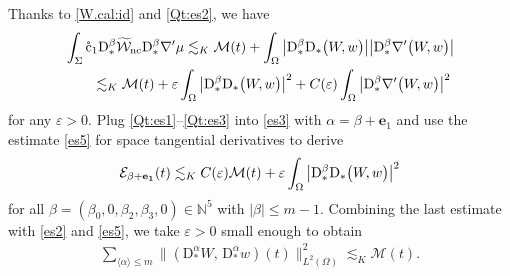\documentclass[twoside,11pt]{article}
\numberwithin{equation}{section}
\begin{document}
Thanks to \eqref{W.cal:id} and \eqref{Qt:es2}, we have
\begin{align}
&\int_{\Sigma} \mathring{\rm c}_1\mathrm{D}_*^{\beta} \widetilde{\mathcal{W}}_{\rm nc}\mathrm{D}_*^{\beta} \nabla'\mu
	\lesssim_K
	\mathcal{M}(t)+
	 \int_{\Omega} \big|\mathrm{D}_*^{\beta} \mathrm{D}_*\big( W,  w \big)\big|
	 \big|\mathrm{D}_*^{\beta} \nabla'\big(  W,  w \big)\big|
	 \nonumber\\
&\qquad 	 \lesssim_K
	 	 \mathcal{M}(t)+
	 \varepsilon \int_{\Omega} \big|\mathrm{D}_*^{\beta} \mathrm{D}_*\big( W,  w \big)\big|^2
	 +C(\varepsilon)
	 \int_{\Omega} \big|\mathrm{D}_*^{\beta} \nabla'\big( W,  w \big)\big|^2
	 \label{Qt:es3}
\end{align}
for any $\varepsilon>0$.
Plug \eqref{Qt:es1}--\eqref{Qt:es3} into \eqref{es3} with $\alpha=\beta+\mathbf{e}_1$ and use
the estimate \eqref{es5} for space tangential derivatives to derive
\begin{align}
\mathcal{E}_{\beta+\bf{e}_1}(t)
	\lesssim_K
	C(\varepsilon)\mathcal{M}(t)+
	\varepsilon \int_{\Omega} \big|\mathrm{D}_*^{\beta} \mathrm{D}_*\big( W,  w \big)\big|^2
\nonumber
\end{align}
for all $\beta=(\beta_0,0,\beta_2, \beta_3,0)\in\mathbb{N}^5$ with $|\beta|\leq m-1$.
Combining the last estimate with \eqref{es2} and \eqref{es5}, we take $\varepsilon>0$ small enough to obtain
\begin{align}
		\sum_{\langle \alpha\rangle \leq m}	\|(\mathrm{D}_*^{\alpha}W,\, \mathrm{D}_*^{\alpha}w)(t)\|_{L^2(\Omega)}^2
	\lesssim_K  \mathcal{M}(t). \label{es6}
\end{align}



\end{document}
